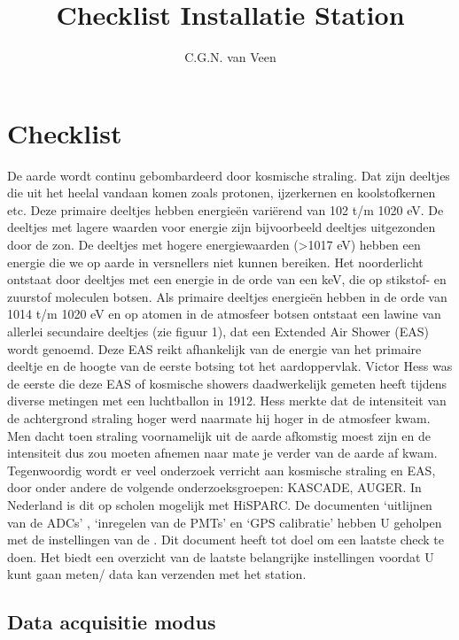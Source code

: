 

\title{Checklist Installatie Station}
\author{C.G.N. van Veen}



\maketitle

\section{Checklist}
De aarde wordt continu gebombardeerd door kosmische straling. Dat zijn deeltjes die uit het heelal vandaan komen zoals protonen, ijzerkernen en koolstofkernen etc. Deze primaire deeltjes hebben energieën variërend van 102 t/m 1020 eV. De deeltjes met lagere waarden voor energie zijn bijvoorbeeld deeltjes uitgezonden door de zon. De deeltjes met hogere energiewaarden (>1017 eV) hebben een energie die we op aarde in versnellers niet kunnen bereiken. Het noorderlicht ontstaat door deeltjes met een energie in de orde van een keV, die op stikstof- en zuurstof moleculen botsen. Als primaire deeltjes energieën hebben in de orde van 1014 t/m 1020 eV  en op atomen in de atmosfeer botsen ontstaat een lawine van allerlei secundaire deeltjes (zie figuur 1),  dat een Extended Air Shower (EAS) wordt genoemd. Deze EAS reikt afhankelijk van de energie van het primaire deeltje en de hoogte van de eerste botsing tot het aardoppervlak. Victor Hess was de eerste die deze EAS of kosmische showers daadwerkelijk gemeten heeft tijdens diverse metingen met een luchtballon in 1912. Hess merkte dat de intensiteit van de achtergrond straling hoger werd naarmate hij hoger in de atmosfeer kwam. Men dacht toen straling voornamelijk uit de aarde afkomstig moest zijn en de intensiteit dus zou moeten afnemen naar mate je verder van de aarde af kwam. Tegenwoordig wordt er veel onderzoek verricht aan kosmische straling en EAS, door onder andere de volgende onderzoeksgroepen: KASCADE, AUGER. In Nederland is dit op scholen mogelijk met HiSPARC.
De documenten `uitlijnen van de ADCs' , `inregelen van de PMTs' en 
`GPS calibratie' hebben U geholpen met de instellingen van de \hisparc
\daq. Dit document heeft tot doel om een laatste check te doen. Het
biedt een overzicht van de laatste belangrijke instellingen voordat U kunt gaan
meten/ data kan verzenden met het \hisparc station. 

\subsection{Data acquisitie modus}

